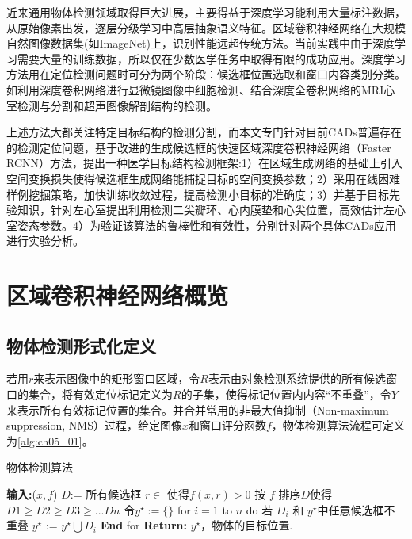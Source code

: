 近来通用物体检测领域取得巨大进展，主要得益于深度学习能利用大量标注数据，从原始像素出发，逐层分级学习中高层抽象语义特征\citep{Sharif2014}。区域卷积神经网络\citep{Girshick2014b}在大规模自然图像数据集(如ImageNet\citep{Deng2009ImageNet})上，识别性能远超传统方法\citep{Girshick2014b,Krizhevsky2012}。当前实践中由于深度学习需要大量的训练数据，所以仅在少数医学任务中取得有限的成功应用。深度学习方法用在定位检测问题时可分为两个阶段\citep{Girshick2015b}：候选框位置选取和窗口内容类别分类。如利用深度卷积网络进行显微镜图像中细胞检测\citep{Akram2016}、结合深度全卷积网络的MRI心室检测与分割\citep{Emad2015,Tran2016a}和超声图像解剖结构的检测\citep{Chen2016i}。

上述方法大都关注特定目标结构的检测分割，而本文专门针对目前CADs普遍存在的检测定位问题，基于改进的生成候选框的快速区域深度卷积神经网络（Faster RCNN）\citep{Ren2015a}方法，提出一种医学目标结构检测框架:1）在区域生成网络的基础上引入空间变换损失使得候选框生成网络能捕捉目标的空间变换参数；2）采用在线困难样例挖掘策略，加快训练收敛过程，提高检测小目标的准确度；3）并基于目标先验知识，针对左心室提出利用检测二尖瓣环、心内膜垫和心尖位置，高效估计左心室姿态参数。4）为验证该算法的鲁棒性和有效性，分别针对两个具体CADs应用进行实验分析。

\section{区域卷积神经网络概览}
 
\subsection{物体检测形式化定义}
若用$r$来表示图像中的矩形窗口区域，令$R$表示由对象检测系统提供的所有候选窗口的集合，将有效定位标记定义为$R$的子集，使得标记位置内内容“不重叠”，令$Y$来表示所有有效标记位置的集合。并合并常用的非最大值抑制（Non-maximum suppression, NMS）过程，给定图像$x$和窗口评分函数$f$，物体检测算法流程可定义为\ref{alg:ch05_01}。
\begin{algorithm}[!htbp]
      \small
      \caption{物体检测算法}\label{alg:ch05_01}
      \begin{algorithmic}

          \State \textbf{输入:}{($x,f$)}
          \State $D$:= 所有候选框 $r \in$ 使得$f(x, r) > 0$            
          \State 按 $f$ 排序$D$使得 $D1\geq D2 \geq D3 \geq ...Dn$ 
          \State 令$y^\star:=\{ \}$
          \State \qquad for $i = 1$ to $n$ do
          \State  \qquad\qquad  若 $D_{i}$ 和 $y^\star$中任意候选框不重叠
          \State   \qquad \qquad      $y^\star$ := $y^\star  \bigcup {D_{i}}$
          \State \qquad\textbf{End} for 
          \State \textbf{Return:}  $y^\star$，物体的目标位置.
      \end{algorithmic}
  \end{algorithm} 
 

